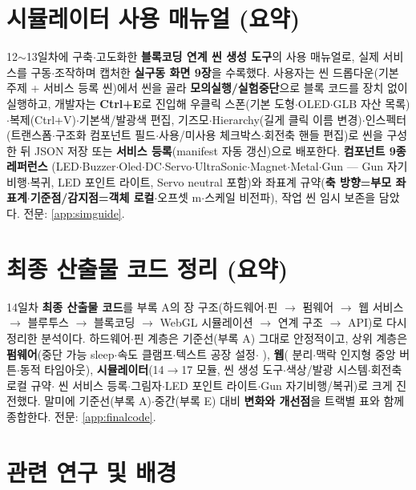\section{시뮬레이터 사용 매뉴얼 (요약)}
12$\sim$13일차에 구축$\cdot$고도화한 \textbf{블록코딩 연계 씬 생성 도구}의 사용
매뉴얼로, 실제 서비스를 구동$\cdot$조작하며 캡처한 \textbf{실구동 화면 9장}을 수록했다.
사용자는 씬 드롭다운(기본 주제 + 서비스 등록 씬)에서 씬을 골라
\textbf{모의실행/실험중단}으로 블록 코드를 장치 없이 실행하고, 개발자는 \textbf{Ctrl+E}로
진입해 우클릭 스폰(기본 도형$\cdot$OLED$\cdot$GLB 자산 목록)$\cdot$복제(Ctrl+V)$\cdot$기본색/발광색
편집, 기즈모$\cdot$Hierarchy(길게 클릭 이름 변경)$\cdot$인스펙터(트랜스폼$\cdot$구조화 컴포넌트
필드$\cdot$사용/미사용 체크박스$\cdot$회전축 핸들 편집)로 씬을 구성한 뒤 JSON 저장 또는
\textbf{서비스 등록}(manifest 자동 갱신)으로 배포한다. \textbf{컴포넌트 9종 레퍼런스}
(LED$\cdot$Buzzer$\cdot$Oled$\cdot$DC$\cdot$Servo$\cdot$UltraSonic$\cdot$Magnet$\cdot$Metal$\cdot$Gun --- Gun
자기 비행$\cdot$복귀, LED 포인트 라이트, Servo neutral 포함)와 좌표계 규약(\textbf{축
방향=부모 좌표계$\cdot$기준점/감지점=객체 로컬}$\cdot$오프셋 m$\cdot$스케일 비전파),
작업 씬 임시 보존을 담았다.
\noindent 전문: \ref{app:simguide}.

\section{최종 산출물 코드 정리 (요약)}
14일차 \textbf{최종 산출물 코드}를 부록 A의 장 구조(하드웨어$\cdot$핀 $\to$ 펌웨어 $\to$ 웹
서비스 $\to$ 블루투스 $\to$ 블록코딩 $\to$ WebGL 시뮬레이션 $\to$ 연계 구조 $\to$ API)로 다시
정리한 분석이다. 하드웨어$\cdot$핀 계층은 기준선(부록 A) 그대로 안정적이고, 상위 계층은
\textbf{펌웨어}(중단 가능 sleep$\cdot$속도 클램프$\cdot$텍스트 공장 설정$\cdot$
), \textbf{웹}( 분리$\cdot$맥락 인지형 중앙 버튼$\cdot$동적 타임아웃),
\textbf{시뮬레이터}(14$\to$17 모듈, 씬 생성 도구$\cdot$색상/발광 시스템$\cdot$회전축 로컬 규약$\cdot$%
씬 서비스 등록$\cdot$그림자$\cdot$LED 포인트 라이트$\cdot$Gun 자기비행/복귀)로 크게 진전했다.
말미에 기준선(부록 A)$\cdot$중간(부록 E) 대비 \textbf{변화와 개선점}을 트랙별 표와 함께
종합한다.
\noindent 전문: \ref{app:finalcode}.


\section{관련 연구 및 배경}

